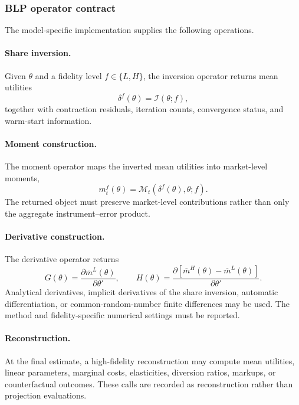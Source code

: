 \subsubsection{BLP operator contract}

The model-specific implementation supplies the following operations.

\paragraph{Share inversion.}
Given $\theta$ and a fidelity level $f\in\{L,H\}$, the inversion operator
returns mean utilities
\begin{equation}
 \delta^{f}(\theta)
 =
 \mathcal I(\theta;f),
 \label{eq:app_blp_inversion}
\end{equation}
together with contraction residuals, iteration counts, convergence status, and
warm-start information.

\paragraph{Moment construction.}
The moment operator maps the inverted mean utilities into market-level moments,
\begin{equation}
 m_t^{f}(\theta)
 =
 \mathcal M_t(\delta^{f}(\theta),\theta;f).
 \label{eq:app_blp_moments}
\end{equation}
The returned object must preserve market-level contributions rather than only
the aggregate instrument--error product.

\paragraph{Derivative construction.}
The derivative operator returns
\begin{equation}
 G(\theta)
 =
 \frac{\partial \overline m^{L}(\theta)}{\partial\theta'},
 \qquad
 H(\theta)
 =
 \frac{\partial
 [\overline m^{H}(\theta)-\overline m^{L}(\theta)]
 }{\partial\theta'}.
 \label{eq:app_blp_derivatives}
\end{equation}
Analytical derivatives, implicit derivatives of the share inversion, automatic
differentiation, or common-random-number finite differences may be used. The
method and fidelity-specific numerical settings must be reported.

\paragraph{Reconstruction.}
At the final estimate, a high-fidelity reconstruction may compute mean utilities,
linear parameters, marginal costs, elasticities, diversion ratios,
markups, or counterfactual outcomes. These calls are recorded as reconstruction
rather than projection evaluations.

